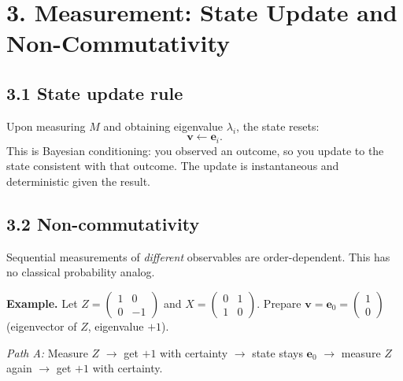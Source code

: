 \documentclass[12pt,a4paper]{article}
\begin{document}
\section{3. Measurement: State Update and Non-Commutativity}

\subsection{3.1 State update rule}
Upon measuring $M$ and obtaining eigenvalue $\lambda_i$, the state resets:
\[
    \mathbf{v} \leftarrow \mathbf{e}_i.
\]
This is Bayesian conditioning: you observed an outcome, so you update to the state consistent with that outcome.  The update is instantaneous and deterministic given the result.

\medskip
\noindent{}

\subsection{3.2 Non-commutativity}
Sequential measurements of \emph{different} observables are order-dependent.  This has no classical probability analog.

\medskip
\noindent\textbf{Example.}  Let $Z = \begin{pmatrix}1&0\\0&-1\end{pmatrix}$ and $X = \begin{pmatrix}0&1\\1&0\end{pmatrix}$.  Prepare $\mathbf{v} = \mathbf{e}_0 = \begin{pmatrix}1\\0\end{pmatrix}$ (eigenvector of $Z$, eigenvalue $+1$).

\medskip
\noindent\textit{Path A:} Measure $Z$ $\to$ get $+1$ with certainty $\to$ state stays $\mathbf{e}_0$ $\to$ measure $Z$ again $\to$ get $+1$ with certainty.
\end{document}
